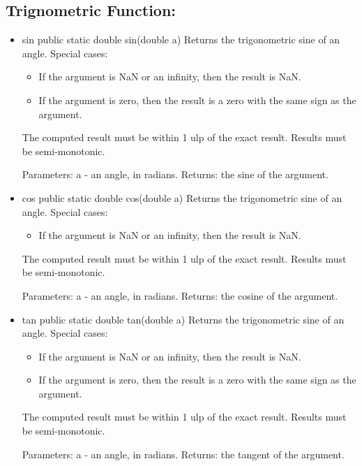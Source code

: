 \documentclass[11pt]{article}
\begin{document}
	\subsection{Trignometric Function:}
		\begin{itemize}
			\item sin
				public static double sin(double a)\newline
				Returns the trigonometric sine of an angle. Special cases:
				\begin{itemize}
				\item If the argument is NaN or an infinity, then the result is NaN.
				\item If the argument is zero, then the result is a zero with the same sign as the argument.
				\end{itemize}
				
				The computed result must be within 1 ulp of the exact result. Results must be semi-monotonic.

				Parameters:\newline
			           a - an angle, in radians.\newline
				Returns:\newline
				the sine of the argument.
			\item cos
				public static double cos(double a)\newline
				Returns the trigonometric sine of an angle. Special cases:
				\begin{itemize}
				\item If the argument is NaN or an infinity, then the result is NaN.
				\end{itemize}
				
				The computed result must be within 1 ulp of the exact result. Results must be semi-monotonic.

				Parameters:\newline
			           a - an angle, in radians.\newline
				Returns:\newline
				the cosine of the argument.
			\item tan
				public static double tan(double a)\newline
				Returns the trigonometric sine of an angle. Special cases:
				\begin{itemize}
				\item If the argument is NaN or an infinity, then the result is NaN.
				\item If the argument is zero, then the result is a zero with the same sign as the argument.
				\end{itemize}
				
				The computed result must be within 1 ulp of the exact result. Results must be semi-monotonic.

				Parameters:\newline
			           a - an angle, in radians.\newline
				Returns:\newline
				the tangent of the argument.
		\end{itemize}
\end{document}
